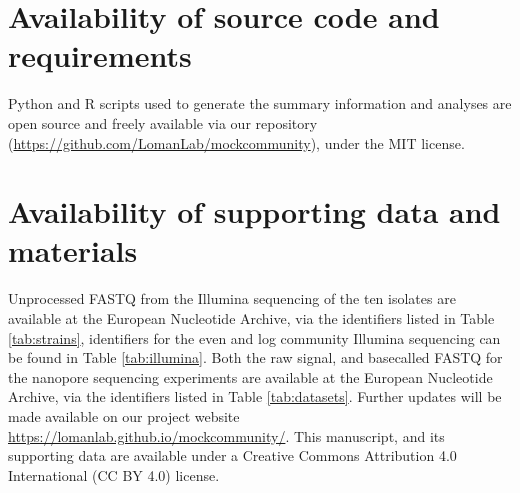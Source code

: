 \documentclass[a4paper,num-refs]{oup-contemporary}
\begin{document}


\section{Availability of source code and requirements}
Python and R scripts used to generate the summary information and analyses are open source and freely available via our repository (\url{https://github.com/LomanLab/mockcommunity}), under the MIT license.



\section{Availability of supporting data and materials}
Unprocessed FASTQ from the Illumina sequencing of the ten isolates are available at the European Nucleotide Archive, via the identifiers listed in Table \ref{tab:strains}, identifiers for the even and log community Illumina sequencing can be found in Table \ref{tab:illumina}.
Both the raw signal, and basecalled FASTQ for the nanopore sequencing experiments are available at the European Nucleotide Archive, via the identifiers listed in Table \ref{tab:datasets}.
Further updates will be made available on our project website \url{https://lomanlab.github.io/mockcommunity/}.
This manuscript, and its supporting data are available under a Creative Commons Attribution 4.0 International (CC BY 4.0) license.
\end{document}
